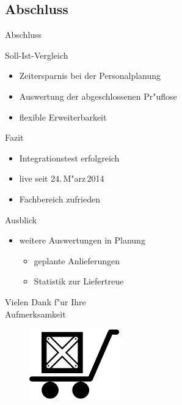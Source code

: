 \subsection{Abschluss}
\begin{frame}[<+->]{Abschluss}
	\begin{block}{Soll-Ist-Vergleich}
		\begin{itemize}
			\item{Zeitersparnis bei der Personalplanung \checkmark}
			\item{Auswertung der abgeschlossenen Pr"uflose \checkmark}
			\item{flexible Erweiterbarkeit \checkmark}
		\end{itemize}
	\end{block}
	\begin{block}{Fazit}
		\begin{itemize}
			\item Integrationstest erfolgreich
			\item live seit 24.\,M"arz\,2014
			\item Fachbereich zufrieden
		\end{itemize}
	\end{block}
	\begin{block}{Ausblick}
		\begin{itemize}
			\item{weitere Auswertungen in Planung
				\begin{itemize}
					\item{geplante Anlieferungen}
					\item{Statistik zur Liefertreue}
				\end{itemize}
			}
		\end{itemize}
	\end{block}
\end{frame}

\begin{frame}{}
\begin{center}
\huge{Vielen Dank f"ur Ihre\\Aufmerksamkeit}\\
\begin{figure}[b!]
\includegraphics{images/platform11}
\end{figure}
\end{center}
\end{frame}



